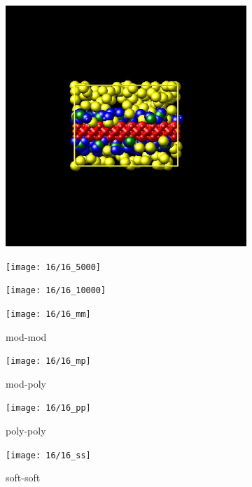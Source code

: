 \documentclass[a4paper]{article}
\begin{document}
\begin{figure}[H]
\begin{subfigure}{0.3\textwidth}
  \centering
  \includegraphics[width=\linewidth,keepaspectratio]{start}
  \caption{}
\end{subfigure}
\begin{subfigure}{0.3\textwidth}
  \centering
  \texttt{[image: 16/16\_5000]}
  \caption{}
\end{subfigure}
\begin{subfigure}{0.3\textwidth}
  \centering
  \texttt{[image: 16/16\_10000]}
  \caption{}
\end{subfigure}
\caption{}
\label{fig_1}
\end{figure}

\begin{figure}[H]
\begin{subfigure}{0.24\textwidth}
  \centering
  \texttt{[image: 16/16\_mm]}
  \caption{mod-mod}
\end{subfigure}
\begin{subfigure}{0.24\textwidth}
  \centering
  \texttt{[image: 16/16\_mp]}
  \caption{mod-poly}
\end{subfigure}
\begin{subfigure}{0.24\textwidth}
  \centering
  \texttt{[image: 16/16\_pp]}
  \caption{poly-poly}
\end{subfigure}
\begin{subfigure}{0.24\textwidth}
  \centering
  \texttt{[image: 16/16\_ss]}
  \caption{soft-soft}
\end{subfigure}
\caption{}
\label{fig_1}
\end{figure}
\end{document}
